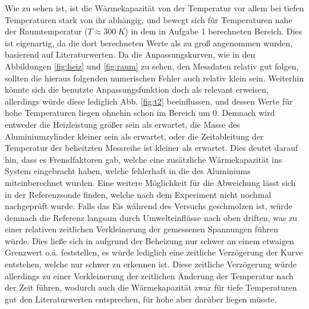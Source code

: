 \documentclass{include/protokollclass}
\begin{document}
Wie zu sehen ist, ist die Wärmekapazität von der Temperatur vor allem bei tiefen Temperaturen stark von ihr abhängig, und bewegt sich für Temperaturen nahe der Raumtemperatur ($T \approx \SI{300}{K}$) in dem in Aufgabe 1 berechneten Bereich. Dies ist eigenartig, da die dort berechneten Werte als zu groß angenommen wurden, basierend auf Literaturwerten. Da die Anpassungskurven, wie in den Abbildungen \ref{fig:heiz} und \ref{fig:raum} zu sehen, den Messdaten relativ gut folgen, sollten die hieraus folgenden numerischen Fehler auch relativ klein sein. Weiterhin könnte sich die benutzte Anpassungsfunktion doch als relevant erweisen, allerdings würde diese lediglich Abb. \ref{fig:t2} beeinflussen, und dessen Werte für hohe Temperaturen liegen ohnehin schon im Bereich um 0. Demnach wird entweder die Heizleistung größer sein als erwartet, die Masse des Aluminiumzylinder kleiner sein als erwartet, oder die Zeitableitung der Temperatur der beheitzten Messreihe ist kleiner als erwartet. Dies deutet darauf hin, dass es Fremdfaktoren gab, welche eine zusätzliche Wärmekapazität ins System eingebracht haben, welche fehlerhaft in die des Aluminiums miteinberechnet wurden. Eine weitere Möglichkeit für die Abweichung lässt sich in der Referenzsonde finden, welche nach dem Experiment nicht nochmal nachgeprüft wurde. Falls das Eis während des Versuchs geschmolzen ist, würde demnach die Referenz langsam durch Umwelteinflüsse nach oben driften, was zu einer relativen zeitlichen Verkleinerung der gemessenen Spannungen führen würde. Dies ließe sich in aufgrund der Beheizung nur schwer an einem etwaigen Grenzwert o.ä. feststellen, es würde lediglich eine zeitliche Verzögerung der Kurve entstehen, welche nur schwer zu erkennen ist. Diese zeitliche Verzögerung würde allerdings zu einer Verkleinerung der zeitlichen Änderung der Temperatur nach der Zeit führen, wodurch auch die Wärmekapazität zwar für tiefe Temperaturen gut den Literaturwerten entsprechen, für hohe aber darüber liegen müsste.
\end{document}
